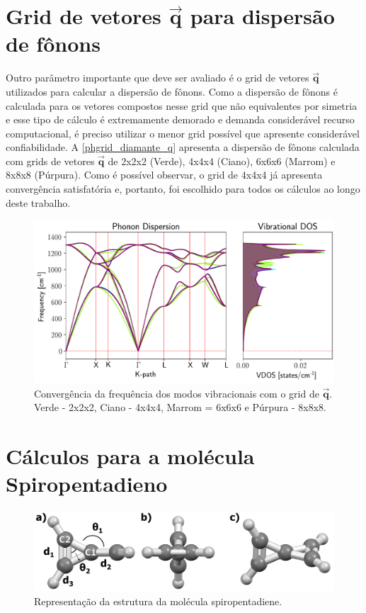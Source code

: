 \documentclass[
	12pt,				%
	openright,			%
	twoside,			%
	a4paper,			%
	chapter=TITLE,		%
	english,			%
	french,				%
	spanish,			%
	brazil				%
	]{abntex2}
\begin{document}
\begin{apendicesenv}
	\section{Grid de vetores $\vec{\mathbf{q}}$ para dispersão de fônons}
		Outro parâmetro importante que deve ser avaliado é o grid de vetores $\vec{\mathbf{q}}$ utilizados para calcular a dispersão de fônons. Como a dispersão de fônons é calculada para os vetores compostos nesse grid que não equivalentes por simetria e esse tipo de cálculo é extremamente demorado e demanda considerável recurso computacional, é preciso utilizar o menor grid possível que apresente considerável confiabilidade. A \autoref{phgrid_diamante_q} apresenta a dispersão de fônons calculada com grids de vetores $\vec{\mathbf{q}}$ de 2x2x2 (Verde), 4x4x4 (Ciano), 6x6x6 (Marrom) e 8x8x8 (Púrpura). Como é possível observar, o grid de 4x4x4 já apresenta convergência satisfatória e, portanto, foi escolhido para todos os cálculos ao longo deste trabalho. 
		
		\begin{figure}[!h]
			\centering
			\includegraphics[width=1.\linewidth]{capitulos/fig/apendices/diamante_phdisp}
			\caption{Convergência da frequência dos modos vibracionais com o grid de $\vec{\mathbf{q}}$. Verde - 2x2x2, Ciano - 4x4x4, Marrom = 6x6x6 e Púrpura - 8x8x8.}
			\label{phgrid_diamante_q}
		\end{figure}


	\section{Cálculos para a molécula Spiropentadieno} \label{chap:spiropentadiene}
	\begin{figure}[!ht]
		\centering
		\includegraphics[width=1\linewidth]{capitulos/fig/apendices/spiropentadiene}
		\caption{Representação da estrutura da molécula spiropentadiene.}
		\label{strutura_spiropentadiene}
	\end{figure}
	

\end{apendicesenv}
\end{document}
